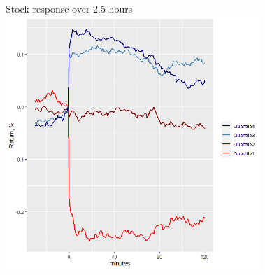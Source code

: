 \documentclass{beamer}
\begin{document}
\begin{frame}{Stock response over 2.5 hours}
\centering
\includegraphics[width=0.72\textwidth]{images/hf_response.png}  
\end{frame}
\end{document}
